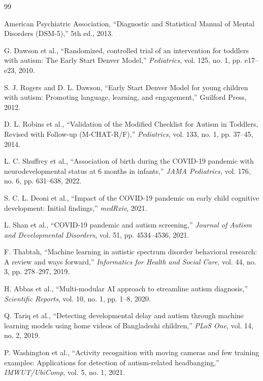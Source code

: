 \documentclass[conference]{IEEEtran}
\begin{document}
\begin{thebibliography}{99}

American Psychiatric Association, ``Diagnostic and Statistical Manual of Mental Disorders (DSM-5),'' 5th ed., 2013.

G. Dawson et al., ``Randomized, controlled trial of an intervention for toddlers with autism: The Early Start Denver Model,'' \textit{Pediatrics}, vol. 125, no. 1, pp. e17--e23, 2010.

S. J. Rogers and D. L. Dawson, ``Early Start Denver Model for young children with autism: Promoting language, learning, and engagement,'' Guilford Press, 2012.

D. L. Robins et al., ``Validation of the Modified Checklist for Autism in Toddlers, Revised with Follow-up (M-CHAT-R/F),'' \textit{Pediatrics}, vol. 133, no. 1, pp. 37--45, 2014.

L. C. Shuffrey et al., ``Association of birth during the COVID-19 pandemic with neurodevelopmental status at 6 months in infants,'' \textit{JAMA Pediatrics}, vol. 176, no. 6, pp. 631--638, 2022.

S. C. L. Deoni et al., ``Impact of the COVID-19 pandemic on early child cognitive development: Initial findings,'' \textit{medRxiv}, 2021.

L. Shan et al., ``COVID-19 pandemic and autism screening,'' \textit{Journal of Autism and Developmental Disorders}, vol. 51, pp. 4534--4536, 2021.

F. Thabtah, ``Machine learning in autistic spectrum disorder behavioral research: A review and ways forward,'' \textit{Informatics for Health and Social Care}, vol. 44, no. 3, pp. 278--297, 2019.

H. Abbas et al., ``Multi-modular AI approach to streamline autism diagnosis,'' \textit{Scientific Reports}, vol. 10, no. 1, pp. 1--8, 2020.

Q. Tariq et al., ``Detecting developmental delay and autism through machine learning models using home videos of Bangladeshi children,'' \textit{PLoS One}, vol. 14, no. 2, 2019.

P. Washington et al., ``Activity recognition with moving cameras and few training examples: Applications for detection of autism-related headbanging,'' \textit{IMWUT/UbiComp}, vol. 5, no. 1, 2021.


\end{thebibliography}
\end{document}
